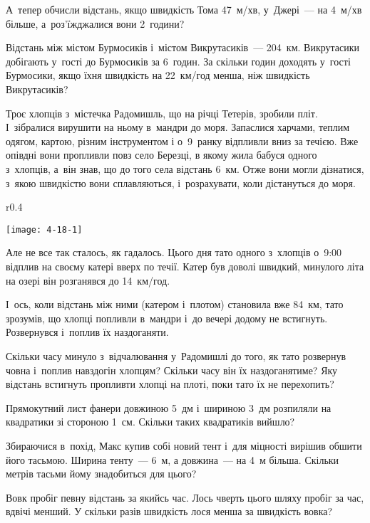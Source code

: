А~тепер обчисли відстань, якщо швидкість Тома 47~м/хв,
у~Джері~--- на 4~м/хв більше, а~роз’їжджалися вони 2~години?


\problem
Відстань між містом Бурмосиків і~містом Викрутасиків~--- 204~км.
Викрутасики добігають у~гості до Бурмосиків за 6~годин.
За скільки годин доходять у~гості Бурмосики,
якщо їхня швидкість на 22~км/год менша, ніж швидкість Викрутасиків?


\problem
{}
Троє хлопців з~містечка Радомишль, що на річці Тетерів, зробили пліт.
І~зібралися вирушити на ньому в~мандри до моря. Запаслися харчами,
теплим одягом, картою, різним інструментом і о~9~ранку відпливли вниз
за течією. Вже опівдні вони пропливли повз село Березці, в якому жила
бабуся одного з~хлопців, а~він знав, що до того села відстань 6~км.
Отже вони могли дізнатися, з~якою швидкістю вони сплавляються,
і~розрахувати, коли дістануться до моря.

\begin{wrapfigure}{r}{0.4\textwidth}
    \begin{center}
        \texttt{[image: 4-18-1]}
    \end{center}
\end{wrapfigure}

Але не все так сталось, як гадалось. Цього дня тато одного з~хлопців
о~9:00 відплив на своєму катері вверх по течії. Катер був доволі швидкий,
минулого літа на озері він розганявся до 14~км/год.

І~ось, коли відстань між ними (катером і~плотом) становила вже 84~км,
тато зрозумів, що хлопці попливли в~мандри і~до вечері додому не встигнуть.
Розвернувся і~поплив їх наздоганяти.

Скільки часу минуло з~відчалювання у~Радомишлі до того, як тато
розвернув човна і~поплив навздогін хлопцям?
Скільки часу він їх наздоганятиме?
Яку відстань встигнуть пропливти хлопці на плоті, поки тато їх не перехопить?


\problem
Прямокутний лист фанери довжиною 5~дм і~шириною 3~дм розпиляли на квадратики
зі стороною 1~см.
Скільки таких квадратиків вийшло?


\problem
Збираючися в~похід, Макс купив собі новий тент і~для міцності вирішив
обшити його тасьмою. Ширина тенту~--- 6~м, а довжина~--- на 4~м більша.
Скільки метрів тасьми йому знадобиться для цього?


\problem
Вовк пробіг певну відстань за якийсь час.
Лось чверть цього шляху пробіг за час, вдвічі менший.
У скільки разів швидкість лося менша за швидкість вовка?


